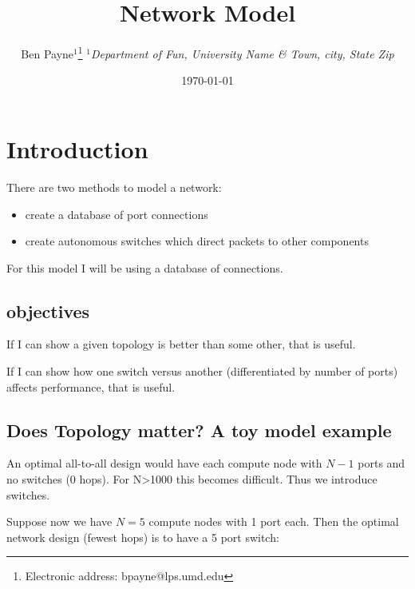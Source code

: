\documentclass[pdftex]{article}
\begin{document}
\title{Network Model}

\author{Ben Payne$^{1}$\footnote{Electronic address: bpayne@lps.umd.edu}
{\it $^{1}$Department of Fun, University Name \& Town, city, State Zip}}

\date{\today}





\section{Introduction}

There are two methods to model a network:
\begin{itemize}
 \item create a database of port connections
 \item create autonomous switches which direct packets to other components
\end{itemize}
For this model I will be using a database of connections.

\subsection{objectives}

If I can show a given topology is better than some other, that is useful.

If I can show how one switch versus another (differentiated by number of ports) affects performance, that is useful.

\subsection{Does Topology matter? A toy model example}

An optimal all-to-all design would have each compute node with $N-1$ ports and no switches (0 hops). For N>1000 this becomes difficult. Thus we introduce switches.

Suppose now we have $N=5$ compute nodes with 1 port each. Then the optimal network design (fewest hops) is to have a 5 port switch:
\end{document}
